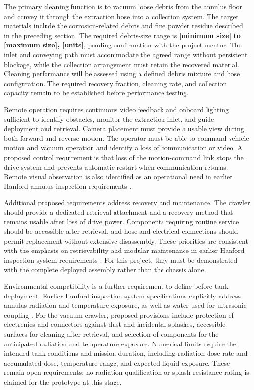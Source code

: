 The primary cleaning function is to vacuum loose debris from the annulus floor and convey it through the extraction hose into a collection system. The target materials include the corrosion-related debris and fine powder residue described in the preceding section. The required debris-size range is \textbf{[minimum size] to [maximum size], [units]}, pending confirmation with the project mentor. The inlet and conveying path must accommodate the agreed range without persistent blockage, while the collection arrangement must retain the recovered material. Cleaning performance will be assessed using a defined debris mixture and hose configuration. The required recovery fraction, cleaning rate, and collection capacity remain to be established before performance testing.

Remote operation requires continuous video feedback and onboard lighting sufficient to identify obstacles, monitor the extraction inlet, and guide deployment and retrieval. Camera placement must provide a usable view during both forward and reverse motion. The operator must be able to command vehicle motion and vacuum operation and identify a loss of communication or video. A proposed control requirement is that loss of the motion-command link stops the drive system and prevents automatic restart when communication returns. Remote visual observation is also identified as an operational need in earlier Hanford annulus inspection requirements \citep{pardini2001DSTRequirements}.

Additional proposed requirements address recovery and maintenance. The crawler should provide a dedicated retrieval attachment and a recovery method that remains usable after loss of drive power. Components requiring routine service should be accessible after retrieval, and hose and electrical connections should permit replacement without extensive disassembly. These priorities are consistent with the emphasis on retrievability and modular maintenance in earlier Hanford inspection-system requirements \citep{pardini2001DSTRequirements}. For this project, they must be demonstrated with the complete deployed assembly rather than the chassis alone.

Environmental compatibility is a further requirement to define before tank deployment. Earlier Hanford inspection-system specifications explicitly address annulus radiation and temperature exposure, as well as water used for ultrasonic coupling \citep{pardini2001DSTRequirements}. For the vacuum crawler, proposed provisions include protection of electronics and connectors against dust and incidental splashes, accessible surfaces for cleaning after retrieval, and selection of components for the anticipated radiation and temperature exposure. Numerical limits require the intended tank conditions and mission duration, including radiation dose rate and accumulated dose, temperature range, and expected liquid exposure. These remain open requirements; no radiation qualification or splash-resistance rating is claimed for the prototype at this stage.
\par
\endgroup






